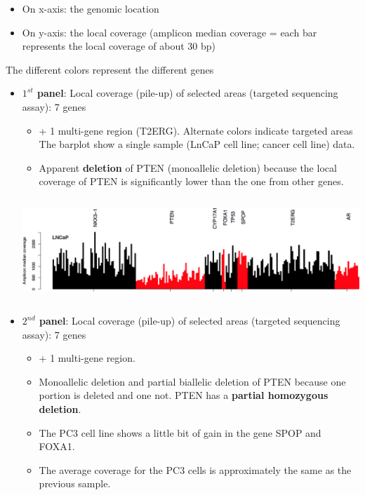 \begin{itemize}
  \item On x-axis: the genomic location
  \item On y-axis: the local coverage (amplicon median coverage = each bar represents
  the local coverage of about 30 bp)
\end{itemize}

The different colors represent the different genes


\begin{itemize}
  \item \textbf{$1^{st}$ panel}: Local coverage (pile-up) of selected areas (targeted sequencing assay): 7 genes

  \begin{itemize}
    \item + 1 multi-gene region (T2ERG). Alternate colors indicate targeted areas The
    barplot show a single sample (LnCaP cell line; cancer cell line) data.
    \item Apparent \textbf{deletion} of PTEN (monoallelic deletion) because the local
    coverage of PTEN is significantly lower than the one from other genes.
  \end{itemize}
  
  \includegraphics[width=6.13481in,height=1.52625in]{image16.png}

  \item \textbf{$2^{nd}$ panel}: Local coverage (pile-up) of selected areas (targeted sequencing assay): 7 genes

  \begin{itemize}
    \item + 1 multi-gene region.
    \item Monoallelic deletion and partial biallelic deletion of PTEN because one portion
    is deleted and one not. PTEN has a \textbf{partial homozygous deletion}.
    \item The PC3 cell line shows a little bit of gain in the gene SPOP and FOXA1.
    \item The average coverage for the PC3 cells is approximately the same as the previous
    sample.
  \end{itemize}
  

\end{itemize}
